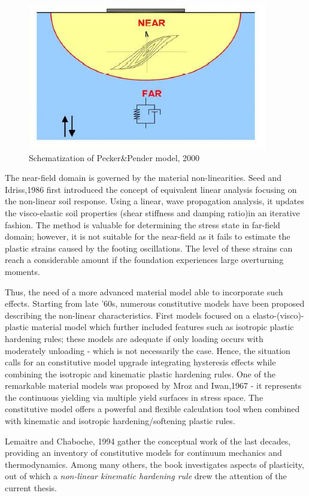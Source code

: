 \documentclass[12pt,a4paper]{report}
\begin{document}
\begin{figure}[h!]
	\centering
	\includegraphics[width=0.7\linewidth]{"nearfar"}
	\caption{Schematization of Pecker\&Pender model, 2000}
	\label{near}
\end{figure}

The near-field domain is governed by the material non-linearities. Seed and Idriss,1986	\cite{seed1986use} first introduced the concept of equivalent linear analysis focusing on the non-linear soil response. Using a linear, wave propagation analysis, it updates the visco-elastic soil properties (shear stiffness and damping ratio)in an iterative fashion. The method is valuable for determining the stress state in far-field domain; however, it is not suitable for the near-field as it fails to estimate the plastic strains caused by the footing oscillations. The level of these strains can reach a considerable amount if the foundation experiences large overturning moments.

Thus, the need of a more advanced material model able to incorporate such effects. Starting from late '60s, numerous constitutive models have been proposed describing the non-linear characteristics. First models focused on a elasto-(visco)-plastic material model which further included features such as isotropic plastic hardening rules; these models are adequate if only loading occurs with moderately unloading - which is not necessarily the case. Hence, the situation calls for an constitutive model upgrade integrating hysteresis effects while combining the isotropic and kinematic plastic hardening rules. One of the remarkable material models was proposed by Mroz and Iwan,1967 \cite{mroz1967description} - it represents the continuous yielding via multiple yield surfaces in stress space. The constitutive model offers a powerful and flexible calculation tool when combined with kinematic and isotropic hardening/softening plastic rules.

Lemaitre and Chaboche, 1994 \cite{lemaitre1994mechanics} gather the conceptual work of the last decades, providing an inventory of constitutive models for continuum mechanics and thermodynamics. Among many others, the book investigates aspects of plasticity, out of which a \textit{non-linear kinematic hardening rule} drew the attention of the current thesis.
\end{document}
